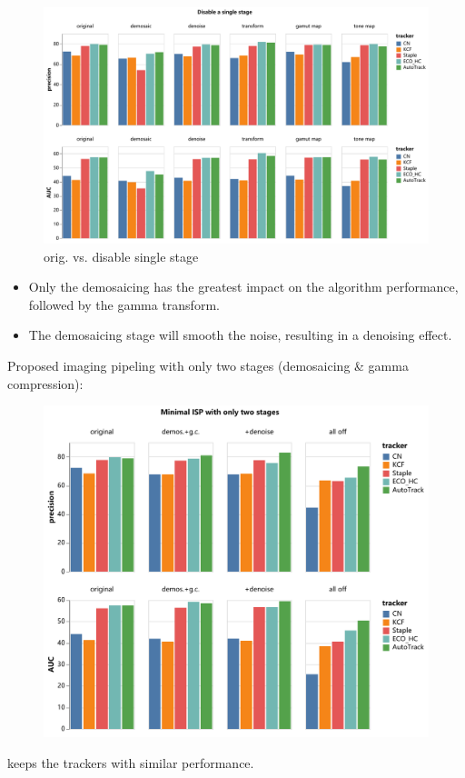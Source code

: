 \documentclass{beamer}
\begin{document}
\begin{frame}
    \begin{figure}[htpb]
        \begin{center}
            \includegraphics[width=0.8\linewidth]{fig/dis.pdf}
            \caption{orig. vs. disable single stage}
        \end{center}
    \end{figure}
\end{frame}

\begin{frame}
    \begin{itemize}[<+-| alert@+>]
        \item Only the demosaicing has the greatest impact on the algorithm performance, followed by the gamma transform.
        \item The demosaicing stage will smooth the noise, resulting in a denoising effect.
    \end{itemize}
\end{frame}

\begin{frame}
    Proposed imaging pipeling with only two stages (demosaicing \& gamma compression):

    \begin{figure}[htpb]
        \begin{center}
            \includegraphics[width=0.6\linewidth]{fig/mini.pdf}
        \end{center}
    \end{figure}

    keeps the trackers with similar performance.

\end{frame}
\end{document}
